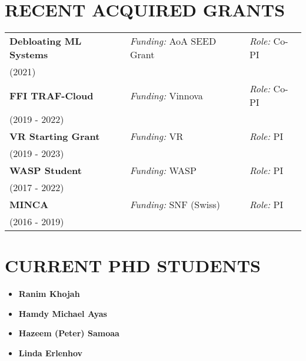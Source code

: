 \documentclass[paper=letter,fontsize=11pt]{scrartcl} %
\newcommand{\NewPart}[2]{\section*{\uppercase{#1} #2}}
\begin{document}
\NewPart{Recent Acquired Grants}{}

\renewcommand{\arraystretch}{0.75}
  \begin{tabular}{p{4.8cm}ll}
          \textbf{Debloating ML Systems} & \emph{Funding:} AoA SEED Grant & \emph{Role:} Co-PI \\
    (2021) & & \\
        \textbf{FFI TRAF-Cloud} & \emph{Funding:} Vinnova & \emph{Role:} Co-PI \\
    (2019 - 2022) & & \\
      \textbf{VR Starting Grant} & \emph{Funding:} VR & \emph{Role:} PI \\
    (2019 - 2023) & & \\
      \textbf{WASP Student} & \emph{Funding:} WASP & \emph{Role:} PI \\
    (2017 - 2022) & & \\
      \textbf{MINCA} & \emph{Funding:} SNF (Swiss) & \emph{Role:} PI \\
    (2016 - 2019) & & \\
  \end{tabular}

  \NewPart{Current PhD Students}{}
\begin{itemize}
\item \textbf{Ranim Khojah} 
\item \textbf{Hamdy Michael Ayas}
\item \textbf{Hazeem (Peter) Samoaa}
\item \textbf{Linda Erlenhov}
\end{itemize}

%
%
\end{document}
